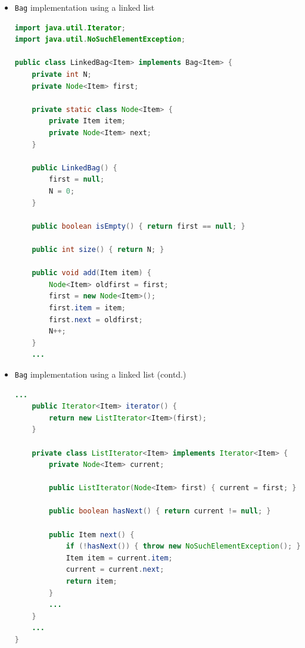 \documentclass[8pt,a4paper,compress]{beamer}
\begin{document}
\begin{frame}[fragile]
\begin{itemize}
\item \lstinline{Bag} implementation using a linked list
\begin{lstlisting}[language=Java]
import java.util.Iterator;
import java.util.NoSuchElementException;

public class LinkedBag<Item> implements Bag<Item> {
    private int N; 
    private Node<Item> first; 

    private static class Node<Item> {
        private Item item;
        private Node<Item> next;
    }

    public LinkedBag() {
        first = null;
        N = 0;
    }

    public boolean isEmpty() { return first == null; }

    public int size() { return N; }

    public void add(Item item) {
        Node<Item> oldfirst = first;
        first = new Node<Item>();
        first.item = item;
        first.next = oldfirst;
        N++;
    }
    ...
\end{lstlisting}
\end{itemize}
\end{frame}

\begin{frame}[fragile]
\begin{itemize}
\item \lstinline{Bag} implementation using a linked list (contd.)
\begin{lstlisting}[language=Java]
    ...
    public Iterator<Item> iterator() { 
        return new ListIterator<Item>(first); 
    }

    private class ListIterator<Item> implements Iterator<Item> {
        private Node<Item> current;

        public ListIterator(Node<Item> first) { current = first; }

        public boolean hasNext() { return current != null; }

        public Item next() {
            if (!hasNext()) { throw new NoSuchElementException(); }
            Item item = current.item;
            current = current.next; 
            return item;
        }
        ...
    }
    ...
}
\end{lstlisting}
\end{itemize}
\end{frame}
\end{document}
